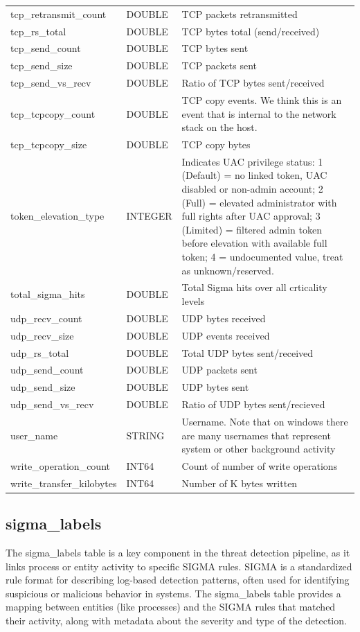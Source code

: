 \documentclass[conference,compsoc]{IEEEtran}
\begin{document}
\begin{longtable}{|p{5cm}|p{2cm}|p{9cm}|}
tcp\_retransmit\_count & DOUBLE & TCP packets retransmitted \\
tcp\_rs\_total & DOUBLE & TCP bytes total (send/received) \\
tcp\_send\_count & DOUBLE & TCP bytes sent \\
tcp\_send\_size & DOUBLE & TCP packets sent \\
tcp\_send\_vs\_recv & DOUBLE & Ratio of TCP bytes sent/received \\
tcp\_tcpcopy\_count & DOUBLE & TCP copy events. We think this is an event that is internal to the network stack on the host. \\
tcp\_tcpcopy\_size & DOUBLE & TCP copy bytes \\
token\_elevation\_type & INTEGER & Indicates UAC privilege status: 1 (Default) = no linked token, UAC disabled or non-admin account; 2 (Full) = elevated administrator with full rights after UAC approval; 3 (Limited) = filtered admin token before elevation with available full token; 4 = undocumented value, treat as unknown/reserved. \\
total\_sigma\_hits & DOUBLE & Total Sigma hits over all crticality levels \\
udp\_recv\_count & DOUBLE & UDP bytes received \\
udp\_recv\_size & DOUBLE & UDP events received \\
udp\_rs\_total & DOUBLE & Total UDP bytes sent/received \\
udp\_send\_count & DOUBLE & UDP packets sent \\
udp\_send\_size & DOUBLE & UDP bytes sent \\
udp\_send\_vs\_recv & DOUBLE & Ratio of UDP bytes sent/recieved \\
user\_name & STRING & Username. Note that on windows there are many usernames that represent system or other background activity \\
write\_operation\_count & INT64 & Count of number of write operations \\
write\_transfer\_kilobytes & INT64 & Number of K bytes written \\
\hline
\end{longtable}

\subsection{sigma\_labels}
\label{sec:sigma_labels}

The sigma\_labels table is a key component in the threat detection pipeline, as it links process or entity activity to specific SIGMA rules. SIGMA is a standardized rule format for describing log-based detection patterns, often used for identifying suspicious or malicious behavior in systems. The sigma\_labels table provides a mapping between entities (like processes) and the SIGMA rules that matched their activity, along with metadata about the severity and type of the detection.
\end{document}
